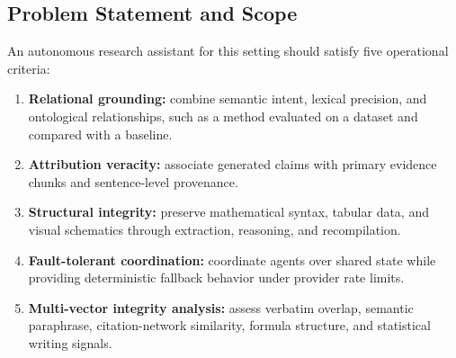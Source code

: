 \documentclass[conference]{IEEEtran}
\begin{document}
\subsection{Problem Statement and Scope}
An autonomous research assistant for this setting should satisfy five operational criteria:
\begin{enumerate}
\item \textbf{Relational grounding:} combine semantic intent, lexical precision, and ontological relationships, such as a method evaluated on a dataset and compared with a baseline.
\item \textbf{Attribution veracity:} associate generated claims with primary evidence chunks and sentence-level provenance.
\item \textbf{Structural integrity:} preserve mathematical syntax, tabular data, and visual schematics through extraction, reasoning, and recompilation.
\item \textbf{Fault-tolerant coordination:} coordinate agents over shared state while providing deterministic fallback behavior under provider rate limits.
\item \textbf{Multi-vector integrity analysis:} assess verbatim overlap, semantic paraphrase, citation-network similarity, formula structure, and statistical writing signals.
\end{enumerate}
\end{document}
